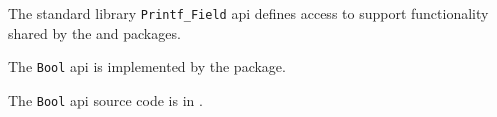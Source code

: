 
The standard library {\tt Printf\_Field} api defines access to support functionality 
shared by the  and  packages.

The {\tt Bool} api is implemented by the  package.

The {\tt Bool} api source code is in .
